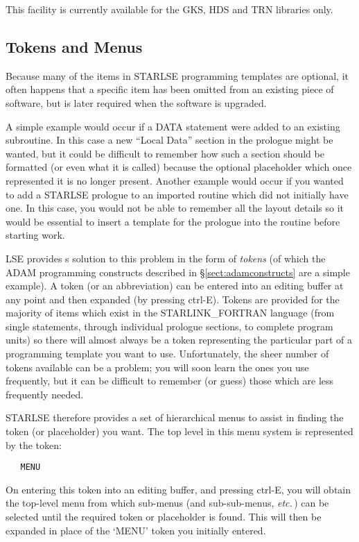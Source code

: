 This facility is currently available for the GKS, HDS and TRN libraries
only. 


\subsection{Tokens and Menus}

Because many of the items in \mbox{STARLSE} programming templates are 
optional, it often happens that a specific item has been omitted from an 
existing piece of software, but is later required when the software is 
upgraded.

A simple example would occur if a \mbox{DATA} statement were added to an 
existing subroutine.
In this case a new ``Local Data'' section in the prologue might be wanted,
but it could be difficult to remember how such a section should be formatted
(or even what it is called) because the optional placeholder which once
represented it is no longer present. 
Another example would occur if you wanted to add a \mbox{STARLSE} prologue
to an imported routine which did not initially have one.
In this case, you would not be able to remember all the layout details so
it would be essential to insert a template for the prologue into the routine
before starting work. 

\mbox{LSE} provides s solution to this problem in the form of {\em tokens}
(of which the \mbox{ADAM} programming constructs described in
\S\ref{sect:adamconstructs} are a simple example). 
A token (or an abbreviation) can be entered into an editing buffer at any 
point and then expanded (by pressing ctrl-E).
Tokens are provided for the majority of items which exist in the
\mbox{STARLINK\_FORTRAN} language (from single statements, through
individual prologue sections, to complete program units) so there will
almost always be a token representing the particular part of a programming
template you want to use. 
Unfortunately, the sheer number of tokens available can be a problem; you
will soon learn the ones you use frequently, but it can be difficult to
remember (or guess) those which are less frequently needed. 

\mbox{STARLSE} therefore provides a set of hierarchical menus to assist in 
finding the token (or placeholder) you want.
The top level in this menu system is represented by the token:

\begin{verbatim}
   MENU
\end{verbatim}

On entering this token into an editing buffer, and pressing ctrl-E, you will
obtain the top-level menu from which sub-menus (and sub-sub-menus, {\em
etc.}\,) can be selected until the required token or placeholder is found.
This will then be expanded in place of the `MENU' token you initially entered.

